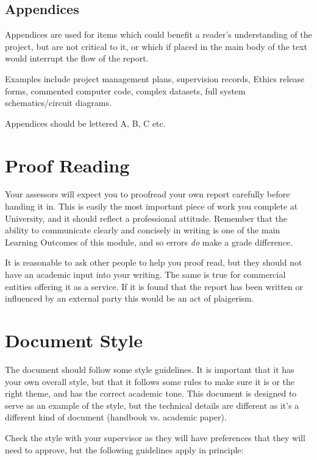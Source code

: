\subsection{Appendices}

Appendices are used for items which could benefit a reader’s understanding of the project, but are not critical to it, or which if placed in the main body of the text would interrupt the flow of the report.

Examples include project management plans, supervision records, Ethics release forms, commented computer code, complex datasets, full system schematics/circuit diagrams.

Appendices should be lettered A, B, C etc.


\section{Proof Reading}

Your assessors will expect you to proofread your own report carefully before handing it in. This is easily the most important piece of work you complete at University, and it should reflect a professional attitude. Remember that the ability to communicate clearly and concisely in writing is one of the main Learning Outcomes of this module, and so errors \textit{do} make a grade difference. 

It is reasonable to ask other people to help you proof read, but they should not have an academic input into your writing. The same is true for commercial entities offering it as a service. If it is found that the report has been written or influenced by an external party this would be an act of plaigerism.

\section{Document Style}

The document should follow some style guidelines. It is important that it has your own overall style, but that it follows some rules to make sure it is or the right theme, and has the correct academic tone. This document is designed to serve as an example of the style, but the technical details are different as it's a different kind of document (handbook vs. academic paper). 

Check the style with your supervisor as they will have preferences that they will need to approve, but the following guidelines apply in principle:

